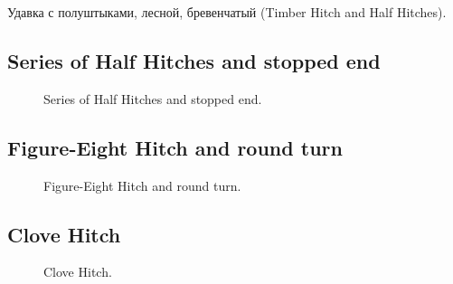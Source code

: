 Удавка с полуштыками, лесной, бревенчатый (Timber Hitch and Half Hitches).

\subsection{Series of Half Hitches and stopped end}

\begin{figure}[H]\centering
	\begin{minipage}{1\linewidth}
		\begin{center}
			\tcbox[enhanced jigsaw,colframe=black,opacityframe=0.5,opacityback=0.5]
			{\centering{}}
		\end{center}
	\end{minipage}
\caption{Series of Half Hitches and stopped end.}
\label{ris:series_of_Half_Hitches_and_stopped_end}
\end{figure}

\subsection{Figure-Eight Hitch and round turn}

\begin{figure}[H]\centering
	\begin{minipage}{1\linewidth}
		\begin{center}
			\tcbox[enhanced jigsaw,colframe=black,opacityframe=0.5,opacityback=0.5]
			{\centering{}}
		\end{center}
	\end{minipage}
\caption{Figure-Eight Hitch and round turn.}
\label{ris:Figure-Eight_Hitch_and_round_turn}
\end{figure}

\subsection{Clove Hitch}

\begin{figure}[H]\centering
	\begin{minipage}{1\linewidth}
		\begin{center}
			\tcbox[enhanced jigsaw,colframe=black,opacityframe=0.5,opacityback=0.5]
			{\centering{}}
		\end{center}
	\end{minipage}
\caption{Clove Hitch.}
\label{ris:Clove_Hitch}
\end{figure}

